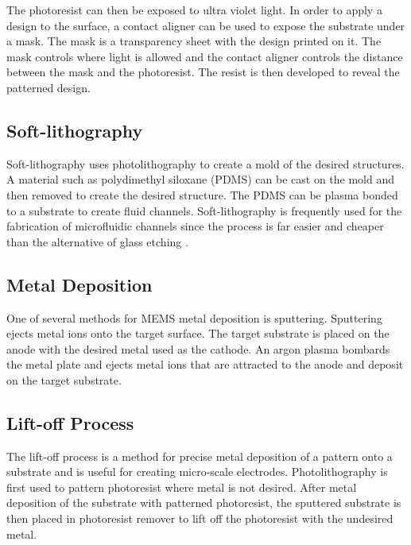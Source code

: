  \par The photoresist can then be exposed to ultra violet light. In order to apply a design to the surface, a contact aligner can be used to expose the substrate under a mask. The mask is a transparency sheet with the design printed on it. The mask controls where light is allowed and the contact aligner controls the distance between the mask and the photoresist. The resist is then developed to reveal the patterned design. 
 
 \subsection*{Soft-lithography}
 
 \par Soft-lithography uses photolithography to create a mold of the desired structures. A material such as polydimethyl siloxane (PDMS) can be cast on the mold and then removed to create the desired structure. The PDMS can be plasma bonded to a substrate to create fluid channels. Soft-lithography is frequently used for the fabrication of microfluidic channels since the process is far easier and cheaper than the alternative of glass etching \cite{whitesides_soft_2001}.
 

 
 \subsection*{Metal Deposition}
 
 \par One of several methods for MEMS metal deposition is sputtering. Sputtering ejects metal ions onto the target surface. The target substrate is placed on the anode with the desired metal used as the cathode. An argon plasma bombards the metal plate and ejects metal ions that are attracted to the anode and deposit on the target substrate. 
 

 
  \subsection*{Lift-off Process}
 \label{sec:lift-off}
 \par The lift-off process is a method for precise metal deposition of a pattern onto a substrate and is useful for creating micro-scale electrodes. Photolithography is first used to pattern photoresist where metal is not desired. After metal deposition of the substrate with patterned photoresist, the sputtered substrate is then placed in photoresist remover to lift off the photoresist with the undesired metal.

